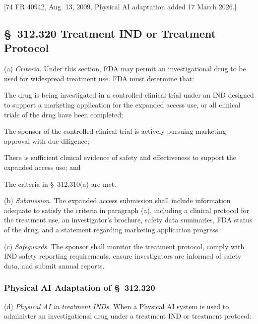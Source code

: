 \documentclass[11pt]{article}
\begin{document}
[74 FR 40942, Aug. 13, 2009. Physical AI adaptation added 17 March 2026.]

\subsection{\S~312.320 Treatment IND or Treatment Protocol}

(a) \textit{Criteria.} Under this section, FDA may permit an investigational drug to be used for widespread treatment use. FDA must determine that:

\begin{description}[leftmargin=0.5cm,style=sameline]
\item[(1)] The drug is being investigated in a controlled clinical trial under an IND designed to support a marketing application for the expanded access use, or all clinical trials of the drug have been completed;
\item[(2)] The sponsor of the controlled clinical trial is actively pursuing marketing approval with due diligence;
\item[(3)] There is sufficient clinical evidence of safety and effectiveness to support the expanded access use; and
\item[(4)] The criteria in \S~312.310(a) are met.
\end{description}

(b) \textit{Submission.} The expanded access submission shall include information adequate to satisfy the criteria in paragraph (a), including a clinical protocol for the treatment use, an investigator's brochure, safety data summaries, FDA status of the drug, and a statement regarding marketing application progress.

(c) \textit{Safeguards.} The sponsor shall monitor the treatment protocol, comply with IND safety reporting requirements, ensure investigators are informed of safety data, and submit annual reports.

\subsubsection{Physical AI Adaptation of \S~312.320}

(d) \textit{Physical AI in treatment INDs.} When a Physical AI system is used to administer an investigational drug under a treatment IND or treatment protocol:
\end{document}
